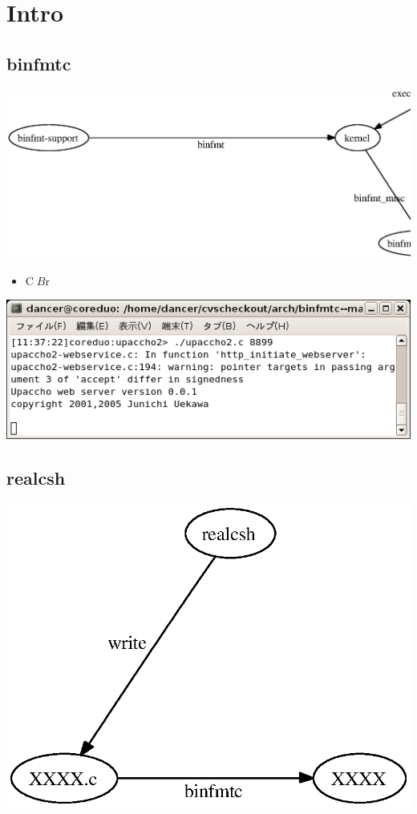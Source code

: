 \documentclass[cjk,dvipdfm]{beamer}
\begin{document}
\section{Intro}
\subsection{binfmtc}
\begin{frame}
\includegraphics[width=1\hsize]{image200609/binfmtc.eps}
\end{frame}

\begin{frame}
\begin{itemize}
 \item C$B$r%
\end{itemize}
\includegraphics[width=1.0\hsize]{image200609/upaccho.png}
\end{frame}


\subsection{realcsh}
\begin{frame}
\includegraphics[width=0.5\hsize]{image200609/realcsh.eps}
\end{frame}
\end{document}
